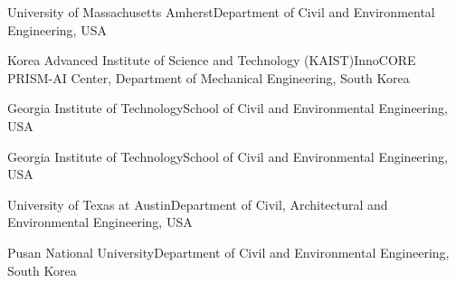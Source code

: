 
  {University of Massachusetts Amherst}{Department of Civil and Environmental Engineering, USA}

  {Korea Advanced Institute of Science and Technology (KAIST)}{InnoCORE PRISM-AI Center, Department of Mechanical Engineering, South Korea}

  {Georgia Institute of Technology}{School of Civil and Environmental Engineering, USA}

  {Georgia Institute of Technology}{School of Civil and Environmental Engineering, USA}

  {University of Texas at Austin}{Department of Civil, Architectural and Environmental Engineering, USA}

  {Pusan National University}{Department of Civil and Environmental Engineering, South Korea}
